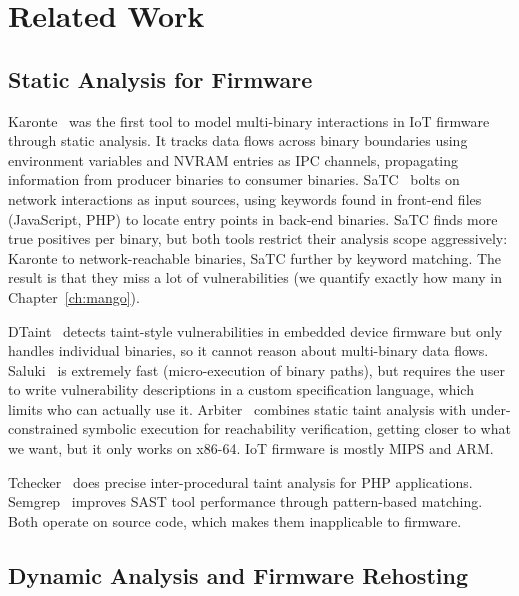 \chapter{Related Work}
\label{ch:related}

\section{Static Analysis for Firmware}

Karonte~\cite{redini2020karonte} was the first tool to model multi-binary interactions in IoT firmware through static analysis. It tracks data flows across binary boundaries using environment variables and NVRAM entries as IPC channels, propagating information from producer binaries to consumer binaries. SaTC~\cite{chen2021satc} bolts on network interactions as input sources, using keywords found in front-end files (JavaScript, PHP) to locate entry points in back-end binaries. SaTC finds more true positives per binary, but both tools restrict their analysis scope aggressively: Karonte to network-reachable binaries, SaTC further by keyword matching. The result is that they miss a lot of vulnerabilities (we quantify exactly how many in Chapter~\ref{ch:mango}).

DTaint~\cite{cheng2018dtaint} detects taint-style vulnerabilities in embedded device firmware but only handles individual binaries, so it cannot reason about multi-binary data flows. Saluki~\cite{gotovchits2018saluki} is extremely fast (micro-execution of binary paths), but requires the user to write vulnerability descriptions in a custom specification language, which limits who can actually use it. Arbiter~\cite{vadayath2022arbiter} combines static taint analysis with under-constrained symbolic execution for reachability verification, getting closer to what we want, but it only works on x86-64. IoT firmware is mostly MIPS and ARM.

Tchecker~\cite{luo2022tchecker} does precise inter-procedural taint analysis for PHP applications. Semgrep~\cite{bennett2024semgrep} improves SAST tool performance through pattern-based matching. Both operate on source code, which makes them inapplicable to firmware.

\section{Dynamic Analysis and Firmware Rehosting}

